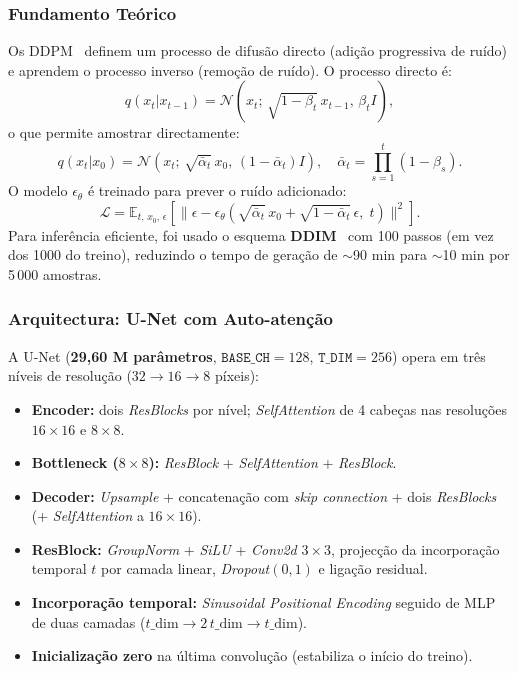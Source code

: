 \documentclass[12pt,a4paper]{article}
\begin{document}
\subsubsection*{Fundamento Teórico}

Os DDPM~\cite{ho2020ddpm} definem um processo de difusão directo (adição progressiva
de ruído) e aprendem o processo inverso (remoção de ruído). O processo directo é:
\begin{equation}
  q(x_t | x_{t-1}) = \mathcal{N}\!\left(x_t;\,\sqrt{1-\beta_t}\,x_{t-1},\,\beta_t I\right),
\end{equation}
o que permite amostrar directamente:
\begin{equation}
  q(x_t | x_0) = \mathcal{N}\!\left(x_t;\,\sqrt{\bar\alpha_t}\,x_0,\,(1-\bar\alpha_t)I\right),
  \quad \bar\alpha_t = \prod_{s=1}^{t}(1-\beta_s).
\end{equation}
O modelo $\epsilon_\theta$ é treinado para prever o ruído adicionado:
\begin{equation}
  \mathcal{L} = \mathbb{E}_{t,\,x_0,\,\epsilon}\!\left[
    \bigl\|\epsilon - \epsilon_\theta\!\left(\sqrt{\bar\alpha_t}\,x_0
    + \sqrt{1-\bar\alpha_t}\,\epsilon,\;t\right)\bigr\|^2\right].
\end{equation}
Para inferência eficiente, foi usado o esquema \textbf{DDIM}~\cite{song2020ddim}
com 100 passos (em vez dos 1000 do treino), reduzindo o tempo de geração de
$\sim$90 min para $\sim$10 min por 5\,000 amostras.

\subsubsection*{Arquitectura: U-Net com Auto-atenção}

A U-Net (\textbf{29,60 M parâmetros}, $\texttt{BASE\_CH}=128$, $\texttt{T\_DIM}=256$)
opera em três níveis de resolução ($32 \to 16 \to 8$ píxeis):

\begin{itemize}
  \item \textbf{Encoder:} dois \textit{ResBlocks} por nível; \textit{SelfAttention}
        de 4 cabeças nas resoluções $16\times16$ e $8\times8$.
  \item \textbf{Bottleneck ($8\times8$):} \textit{ResBlock} + \textit{SelfAttention}
        + \textit{ResBlock}.
  \item \textbf{Decoder:} \textit{Upsample} + concatenação com \textit{skip connection}
        + dois \textit{ResBlocks} (+ \textit{SelfAttention} a $16\times16$).
  \item \textbf{ResBlock:} \textit{GroupNorm} + \textit{SiLU} + \textit{Conv2d}
        $3\times3$, projecção da incorporação temporal $t$ por camada linear,
        \textit{Dropout}$(0{,}1)$ e ligação residual.
  \item \textbf{Incorporação temporal:} \textit{Sinusoidal Positional Encoding}
        seguido de MLP de duas camadas ($t\_\mathrm{dim} \to 2\,t\_\mathrm{dim}
        \to t\_\mathrm{dim}$).
  \item \textbf{Inicialização zero} na última convolução (estabiliza o início do treino).
\end{itemize}
\end{document}
